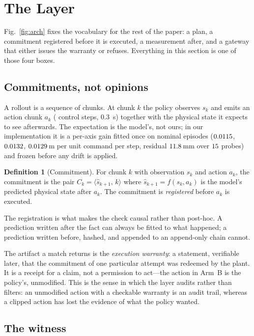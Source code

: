 \documentclass[conference]{IEEEtran}
\theoremstyle{definition}
\newtheorem{definition}{Definition}
\begin{document}
\section{The Layer}
\label{sec:layer}

Fig.~\ref{fig:arch} fixes the vocabulary for the rest of the paper: a plan, a
commitment registered before it is executed, a measurement after, and a gateway
that either issues the warranty or refuses. Everything in this section is one of
those four boxes.

\subsection{Commitments, not opinions}

A rollout is a sequence of chunks. At chunk $k$ the policy observes $s_k$ and
emits an action chunk $a_k$ (\ChunkSteps{} control steps, \SI{0.3}{s}) together
with the physical state it expects to see afterwards.
The expectation is the model's, not ours; in our implementation it is a
per-axis gain fitted once on nominal episodes
($0.0115$, $0.0132$, $0.0129$\,m per unit command per step, residual
$11.8$\,mm over $15$ probes) and frozen before any drift is
applied.

\begin{definition}[Commitment]
For chunk $k$ with observation $s_k$ and action $a_k$, the commitment is the
pair $C_k = \langle \hat{s}_{k+1},\, k\rangle$ where
$\hat{s}_{k+1} = f(s_k, a_k)$ is the model's predicted physical state after
$a_k$. The commitment is \emph{registered} before $a_k$ is executed.
\end{definition}

The registration is what makes the check causal rather than post-hoc. A
prediction written after the fact can always be fitted to what happened; a
prediction written before, hashed, and appended to an append-only chain cannot.

The artifact a match returns is the \emph{execution warranty}: a statement,
verifiable later, that the commitment of one particular attempt was redeemed by
the plant. It is a receipt for a claim, not a permission to act---the action in
Arm~B is the policy's, unmodified. This is the sense in which the layer audits
rather than filters: an unmodified action with a checkable warranty is an audit
trail, whereas a clipped action has lost the evidence of what the policy
wanted.

\subsection{The witness}
\end{document}
